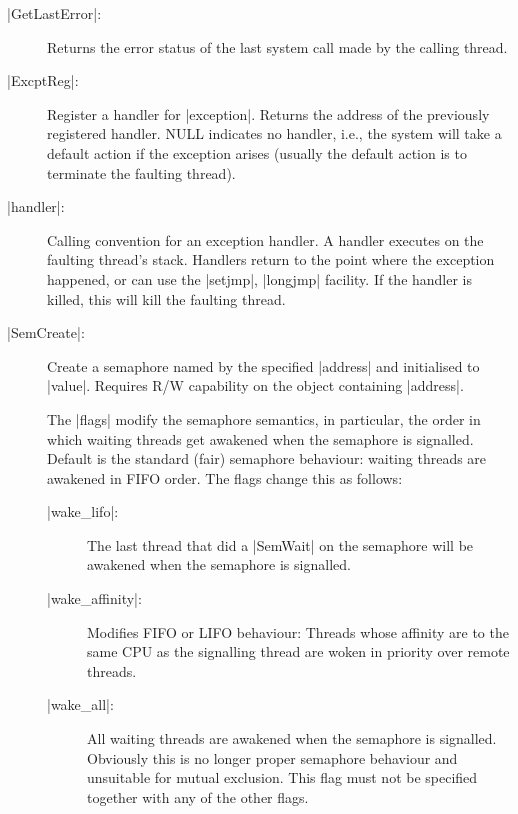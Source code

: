 \documentclass[a4paper,11pt,twoside,dvips]{report}
\begin{document}
\begin{description}

\item[|GetLastError|:] Returns the error status of the last system call
made by the calling thread.

\item[|ExcptReg|:] Register a handler for |exception|. Returns the
address of the previously registered handler. NULL indicates no handler,
i.e., the system will take a default action if the exception arises
(usually the default action is to terminate the faulting thread).



\item[|handler|:] Calling convention for an exception handler. A handler
executes on the faulting thread's stack. Handlers return to
the point where the exception happened, or can use the |setjmp|,
|longjmp| facility. If the handler is killed, this will kill the faulting
thread.

\item[|SemCreate|:] Create a semaphore named by the specified |address|
and initialised to |value|. Requires R/W capability on the object
containing |address|.

The |flags| modify the semaphore semantics, in particular, the order in
which waiting threads get awakened when the semaphore is
signalled. Default is the standard (fair) semaphore behaviour: waiting
threads are awakened in FIFO order. The flags change this as follows:

   \begin{description}

   \item[|wake\_lifo|:] The last thread that did a |SemWait| on the
   semaphore will be awakened when the semaphore is signalled.

   \item[|wake\_affinity|:] Modifies FIFO or LIFO behaviour: Threads
   whose affinity are to the same CPU as the signalling thread are woken
   in priority over remote threads.

   \item[|wake\_all|:] All waiting threads are awakened when the
   semaphore is signalled. Obviously this is no longer proper semaphore
   behaviour and unsuitable for mutual exclusion. This flag must not be
   specified together with any of the other flags.

   \end{description}


\end{description}
\end{document}
